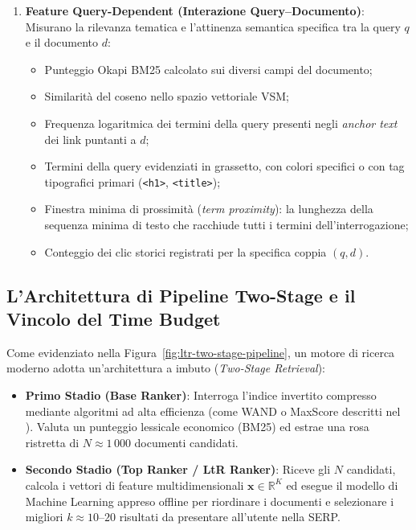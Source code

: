\begin{enumerate}
    \item \textbf{Feature Query-Dependent (Interazione Query--Documento)}:
    Misurano la rilevanza tematica e l'attinenza semantica specifica tra la query $q$ e il documento $d$:
    \begin{itemize}
        \item Punteggio Okapi BM25 calcolato sui diversi campi del documento;
        \item Similarit\`a del coseno nello spazio vettoriale VSM;
        \item Frequenza logaritmica dei termini della query presenti negli \textit{anchor text} dei link puntanti a $d$;
        \item Termini della query evidenziati in grassetto, con colori specifici o con tag tipografici primari (\texttt{<h1>}, \texttt{<title>});
        \item Finestra minima di prossimit\`a (\textit{term proximity}): la lunghezza della sequenza minima di testo che racchiude tutti i termini dell'interrogazione;
        \item Conteggio dei clic storici registrati per la specifica coppia $(q, d)$.
    \end{itemize}
\end{enumerate}

\FloatBarrier
\subsection{L'Architettura di Pipeline Two-Stage e il Vincolo del Time Budget}
\label{subsec:pipeline-two-stage-budget}

Come evidenziato nella Figura~\ref{fig:ltr-two-stage-pipeline}, un motore di ricerca moderno adotta un'architettura a imbuto (\textit{Two-Stage Retrieval}):
\begin{itemize}
    \item \textbf{Primo Stadio (Base Ranker)}: Interroga l'indice invertito compresso mediante algoritmi ad alta efficienza (come WAND o MaxScore descritti nel ). Valuta un punteggio lessicale economico (BM25) ed estrae una rosa ristretta di $N \approx 1\,000$ documenti candidati.
    \item \textbf{Secondo Stadio (Top Ranker / LtR Ranker)}: Riceve gli $N$ candidati, calcola i vettori di feature multidimensionali $\mathbf{x} \in \mathbb{R}^K$ ed esegue il modello di Machine Learning appreso offline per riordinare i documenti e selezionare i migliori $k \approx 10\text{--}20$ risultati da presentare all'utente nella SERP.
\end{itemize}

